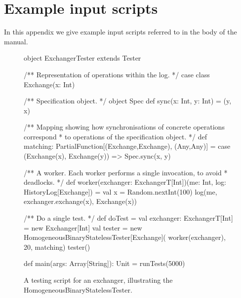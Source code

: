 \section{Example input scripts}
\label{app:examples}

In this appendix we give example input scripts referred to in the body of the
manual.  


\begin{figure}
\begin{scala}
object ExchangerTester extends Tester{
  /** Representation of operations within the log. */
  case class Exchange(x: Int)

  /** Specification object. */
  object Spec{
    def sync(x: Int, y: Int) = (y, x)
  }

  /** Mapping showing how synchronisations of concrete operations correspond 
    * to operations of the specification object. */
  def matching: PartialFunction[(Exchange,Exchange), (Any,Any)] = {
    case (Exchange(x), Exchange(y)) => Spec.sync(x, y) 
  }

  /** A worker.  Each worker performs a single invocation, to avoid
    * deadlocks.  */
  def worker(exchanger: ExchangerT[Int])(me: Int, log: HistoryLog[Exchange]) = {
    val x = Random.nextInt(100)
    log(me, exchanger.exchange(x), Exchange(x))
  }

  /** Do a single test. */
  def doTest = {
    val exchanger: ExchangerT[Int] = new Exchanger[Int]
    val tester = new HomogeneousBinaryStatelessTester[Exchange](
      worker(exchanger), 20, matching)
    tester()
  }

  def main(args: Array[String]): Unit = runTests(5000)
}
\end{scala}
\caption{A testing script for an exchanger, illustrating the {\scalashape
    HomogeneousBinaryStatelessTester}.\label{fig:homo-binary}} 
\end{figure}


